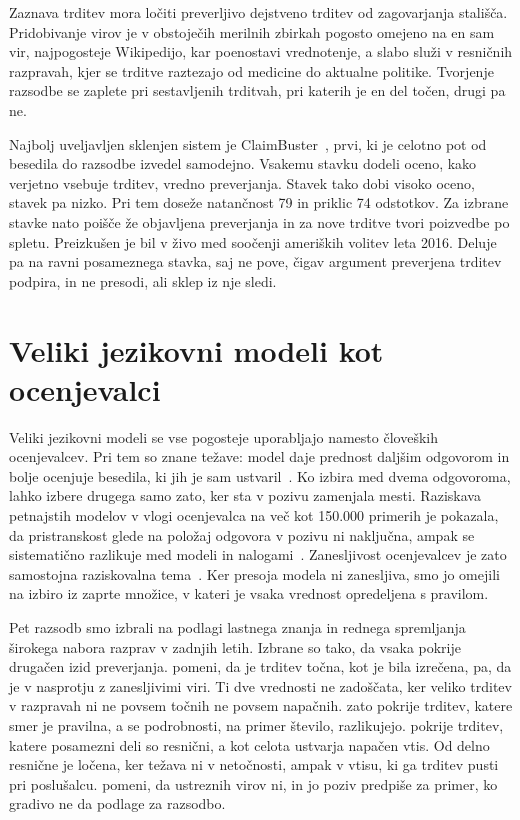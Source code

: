 \documentclass[a4paper, 12pt]{book}
\begin{document}
Zaznava trditev mora ločiti preverljivo dejstveno trditev od zagovarjanja stališča. Pridobivanje virov je v obstoječih merilnih zbirkah pogosto omejeno na en sam vir, najpogosteje Wikipedijo, kar poenostavi vrednotenje, a slabo služi v resničnih razpravah, kjer se trditve raztezajo od medicine do aktualne politike. Tvorjenje razsodbe se zaplete pri sestavljenih trditvah, pri katerih
je en del točen, drugi pa ne.

Najbolj uveljavljen sklenjen sistem je ClaimBuster~\cite{hassan2017claimbuster}, prvi, ki je celotno pot od besedila do razsodbe izvedel samodejno. Vsakemu stavku dodeli oceno, kako verjetno vsebuje trditev, vredno preverjanja. Stavek  tako dobi visoko oceno, stavek  pa nizko. Pri tem doseže natančnost 79 in priklic 74 odstotkov. Za izbrane stavke nato poišče že objavljena preverjanja in za nove trditve tvori poizvedbe po spletu. Preizkušen je bil v živo med soočenji ameriških volitev leta 2016. Deluje pa na ravni posameznega stavka, saj ne pove, čigav argument preverjena trditev podpira, in ne presodi, ali sklep iz nje sledi.

\section{Veliki jezikovni modeli kot ocenjevalci}
\label{sec:llm-judge}

Veliki jezikovni modeli se vse pogosteje uporabljajo namesto človeških ocenjevalcev. Pri tem so znane težave: model daje prednost daljšim odgovorom in bolje ocenjuje besedila, ki jih je sam ustvaril~\cite{zheng2023judging}. Ko izbira med dvema odgovoroma, lahko izbere drugega samo zato, ker sta v pozivu zamenjala mesti. Raziskava petnajstih modelov v vlogi ocenjevalca na več kot 150.000 primerih je pokazala, da pristranskost glede na položaj odgovora v pozivu ni naključna, ampak se sistematično razlikuje med modeli in nalogami~\cite{shi2025judging}. Zanesljivost ocenjevalcev je zato
samostojna raziskovalna tema~\cite{gu2024}. Ker presoja modela ni zanesljiva, smo jo omejili na izbiro iz zaprte množice, v kateri je vsaka vrednost opredeljena s pravilom. 

Pet razsodb smo izbrali na podlagi lastnega znanja in rednega spremljanja širokega nabora razprav v zadnjih letih. Izbrane so tako, da vsaka pokrije drugačen izid preverjanja.  pomeni, da je trditev točna, kot je bila izrečena,  pa, da je v nasprotju z zanesljivimi viri. Ti dve vrednosti ne zadoščata, ker veliko trditev v razpravah ni ne povsem točnih ne povsem napačnih.  zato pokrije trditev, katere smer je pravilna, a se podrobnosti, na primer število, razlikujejo.  pokrije trditev, katere posamezni deli so resnični, a kot celota ustvarja napačen vtis. Od delno resnične je ločena, ker težava ni v netočnosti, ampak v vtisu, ki ga trditev pusti pri poslušalcu.  pomeni, da ustreznih virov ni, in jo poziv predpiše za primer, ko gradivo ne da podlage za razsodbo.
\end{document}
